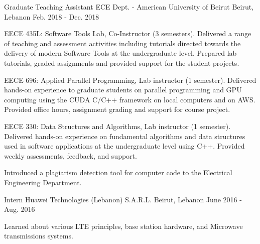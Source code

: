\begin{cventries}
  \cventry
    {Graduate Teaching Assistant} %
    {ECE Dept. - American University of Beirut} %
    {Beirut, Lebanon} %
    {Feb. 2018 - Dec. 2018} %
    { 
      \begin{cvitems} %
        \item {EECE 435L: Software Tools Lab, Co-Instructor (3 semesters).  Delivered a range of teaching and assessment activities including tutorials directed towards the delivery of modern Software Tools at the undergraduate level. Prepared lab tutorials, graded assignments and provided support for the student projects.}
        \item {EECE 696: Applied Parallel Programming, Lab instructor (1 semester). Delivered hands-on experience to graduate students on parallel programming and GPU computing using the CUDA C/C++ framework on local computers and on AWS. Provided office hours, assignment grading and support for course project.}
        \item {EECE 330: Data Structures and Algorithms, Lab instructor (1 semester). Delivered hands-on experience on fundamental algorithms and data structures used in software applications at the undergraduate level using C++. Provided weekly assessments, feedback, and support.}
        \item{Introduced a plagiarism detection tool for computer code to the Electrical Engineering Department.}
      \end{cvitems}
    }

  \cventry
    {Intern} %
    {Huawei Technologies (Lebanon) S.A.R.L.} %
    {Beirut, Lebanon} %
    {June 2016  - Aug. 2016} %
    {
      \begin{cvitems} %
        \item {Learned about various LTE principles, base station hardware, and Microwave transmissions systems.}
      \end{cvitems}
    }

\end{cventries}
